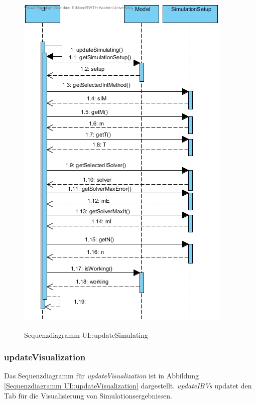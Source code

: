 \begin{figure}[H]
	\centering
	\includegraphics[scale=.55]{Bilder/UI__updateSimulating().jpg}\\
	\caption{Sequenzdiagramm UI::updateSimulating}
	\label{Sequenzdiagramm UI::updateSimulating}
\end{figure}

\subsubsection*{updateVisualization}

Das Sequenzdiagramm für \emph{updateVisualization} ist in Abbildung \ref{Sequenzdiagramm UI::updateVisualization} dargestellt. \emph{updateIBVs} updatet den Tab für die Visualisierung von Simulationsergebnissen.

